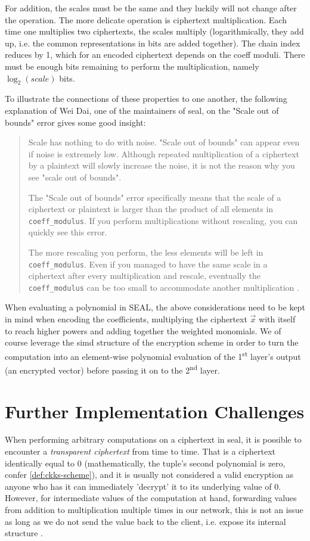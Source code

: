 For addition, the scales must be the same and they luckily will not change after the operation.
The more delicate operation is ciphertext multiplication.
Each time one multiplies two ciphertexts, the scales multiply (logarithmically, they add up, i.e. the common representations in bits are added together).
The chain index reduces by 1, which for an encoded ciphertext depends on the coeff moduli.
There must be enough bits remaining to perform the multiplication, namely $\log_2(scale)$ bits.

To illustrate the connections of these properties to one another, the following explanation of Wei Dai, one of the maintainers of \gls{seal}, on the "Scale out of bounds" error gives some good insight:

\begin{quote}
  Scale has nothing to do with noise. "Scale out of bounds" can appear even if noise is extremely low. Although repeated multiplication of a ciphertext by a plaintext will slowly increase the noise, it is not the reason why you see "scale out of bounds".

  The "Scale out of bounds" error specifically means that the scale of a ciphertext or plaintext is larger than the product of all elements in \texttt{coeff\_modulus}. If you perform multiplications without rescaling, you can quickly see this error.

  The more rescaling you perform, the less elements will be left in \texttt{coeff\_modulus}. Even if you managed to have the same scale in a ciphertext after every multiplication and rescale, eventually the \texttt{coeff\_modulus} can be too small to accommodate another multiplication \parencite{2020-wei-github-comment}.
\end{quote}

When evaluating a polynomial in SEAL, the above considerations need to be kept in mind when encoding the coefficients, multiplying the ciphertext $\vec{x}$ with itself to reach higher powers and adding together the weighted monomials.
We of course leverage the \gls{simd} structure of the encryption scheme in order to turn the computation into an element-wise polynomial evaluation of the 1\textsuperscript{st} layer's output (an encrypted vector) before passing it on to the 2\textsuperscript{nd} layer.

\section{Further Implementation Challenges}
When performing arbitrary computations on a ciphertext in \gls{seal}, it is possible to encounter a \textit{transparent ciphertext} from time to time.
That is a ciphertext identically equal to 0 (mathematically, the tuple's second polynomial is zero, confer \cref{def:ckks-scheme}), and it is usually not considered a valid encryption as anyone who has it can immediately 'decrypt' it to its underlying value of $0$.
However, for intermediate values of the computation at hand, forwarding values from addition to multiplication multiple times in our network, this is not an issue as long as we do not send the value back to the client, i.e. expose its internal structure \parencite{kim-laine-on-transparent-ciphertexts}.


